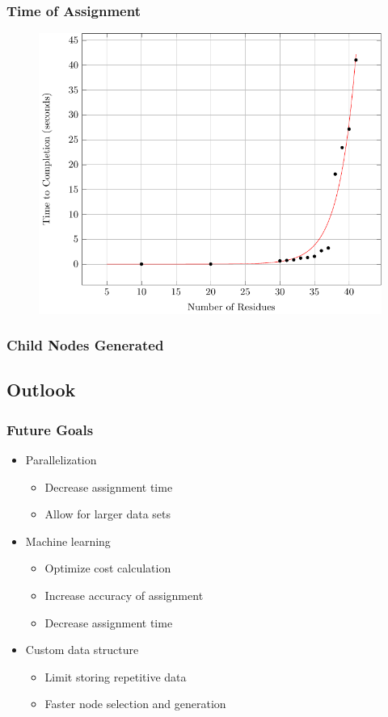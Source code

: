\documentclass{beamer}
\begin{document}
\begin{frame}
	\frametitle{Time of Assignment}
	\begin{figure}[H]
	\begin{center}
	\includegraphics[width=.65\textwidth]{plot}
	\end{center}
	\end{figure}
\end{frame}

\begin{frame}
	\frametitle{Child Nodes Generated}
	\begin{figure}[H]
	\begin{center}
	\resizebox{!}{.6\paperheight}{}
	\end{center}
	\end{figure}
\end{frame}

\subsection{Outlook}
\begin{frame}
	\frametitle{Future Goals} 
	\begin{itemize}
		\item Parallelization
		\begin{itemize}
			\item Decrease assignment time
			\item Allow for larger data sets
		\end{itemize}
		\item Machine learning 
		\begin{itemize}
			\item Optimize cost calculation
			\item Increase accuracy of assignment
			\item Decrease assignment time
		\end{itemize}
		\item Custom data structure
		\begin{itemize}
			\item Limit storing repetitive data
			\item Faster node selection and generation
		\end{itemize}
	\end{itemize} 
\end{frame}
\end{document}
